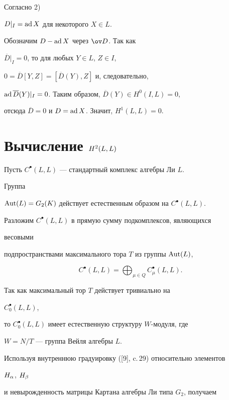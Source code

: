 \begin{pf}
Согласно 2)\; 


$D\vert_I=\operatorname{ad} X$ для некоторого $X\in L$. 


Обозначим $D-\operatorname{ad} X$ через $\ov D$. Так как 


$\overline D\vert_I=0$, то для любых $Y\in L$, $Z\in I$, 


$0=\overline D [Y,Z]=[\overline D(Y),Z]$ и, следовательно, 


$\ad \overline D(Y)|_I =0$. Таким образом, $\overline D(Y)\in 


H^0(I,L)=0$, 


отсюда $\overline D=0$ и $D=\operatorname{ad} X$. Значит, $H^1(L,L)=0$. 


\end{pf} 


 


\section{Вычисление $H^2(L,L) $} 


 


Пусть $C^{\bullet}(L,L)$ --- стандартный комплекс алгебры Ли $L$. 


Группа 


$\operatorname{Aut} (L)=G_2(K)$ действует естественным образом на $C^{\bullet}(L,L)$. 


Разложим $C^{\bullet}(L,L)$ в прямую сумму подкомплексов, являющихся 


весовыми 


подпространствами максимального тора $T$ из группы $\operatorname{Aut} (L)$, 


$$ 


C^{\bullet}(L,L)=\bigoplus_{\mu \in Q}C^{\bullet}_{\mu}(L,L). 


$$ 


Так как максимальный тор $T$ действует тривиально на 


$C^{\bullet}_0(L,L)$, 


то $C^{\bullet}_0(L,L)$ имеет естественную структуру $W$-модуля, где 


$W=N/T$ --- группа Вейля алгебры $L$. 


Используя внутреннюю градуировку ([9], c.\,29) относительно элементов 


$H_{\alpha}$, $H_{\beta}$ 


и невырожденность матрицы Картана алгебры Ли типа $G_2$, получаем 


$$ 


